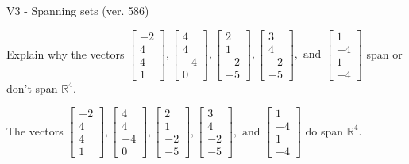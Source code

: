 \begin{exercise}
  \begin{exerciseTitle}V3 - Spanning sets (ver. 586)\end{exerciseTitle}
  \begin{exerciseStatement}
    Explain why the vectors \(\left[\begin{array}{r}
-2 \\
4 \\
4 \\
1
\end{array}\right] , \left[\begin{array}{r}
4 \\
4 \\
-4 \\
0
\end{array}\right] , \left[\begin{array}{r}
2 \\
1 \\
-2 \\
-5
\end{array}\right] , \left[\begin{array}{r}
3 \\
4 \\
-2 \\
-5
\end{array}\right] , \text{ and } \left[\begin{array}{r}
1 \\
-4 \\
1 \\
-4
\end{array}\right]\) span or don't span \(\mathbb{R}^4\). 
	


  \end{exerciseStatement}
  \begin{exerciseAnswer}
   The vectors \(\left[\begin{array}{r}
-2 \\
4 \\
4 \\
1
\end{array}\right] , \left[\begin{array}{r}
4 \\
4 \\
-4 \\
0
\end{array}\right] , \left[\begin{array}{r}
2 \\
1 \\
-2 \\
-5
\end{array}\right] , \left[\begin{array}{r}
3 \\
4 \\
-2 \\
-5
\end{array}\right] , \text{ and } \left[\begin{array}{r}
1 \\
-4 \\
1 \\
-4
\end{array}\right]\) 
  	 do  
	span \(\mathbb{R}^4\).
  



\end{exerciseAnswer}
\end{exercise}

